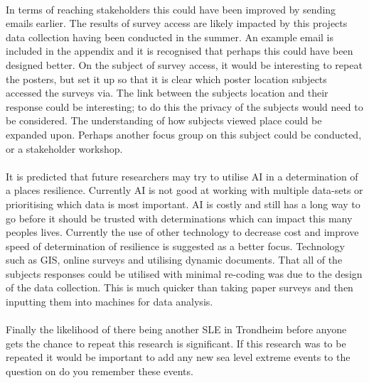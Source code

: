 \paragraph{}
In terms of reaching stakeholders this could have been improved by sending emails earlier. The results of survey access are likely impacted by this projects data collection having been conducted in the summer. An example email is included in the appendix and it is recognised that perhaps this could have been designed better. On the subject of survey access, it would be interesting to repeat the posters, but set it up so that it is clear which poster location subjects accessed the surveys via. The link between the subjects location and their response could be interesting; to do this the privacy of the subjects would need to be considered. The understanding of how subjects viewed place could be expanded upon. Perhaps another focus group on this subject could be conducted, or a stakeholder workshop. 
\paragraph{}
It is predicted that future researchers may try to utilise AI in a determination of a places resilience. Currently AI is not good at working with multiple data-sets or prioritising which data is most important. AI is costly and still has a long way to go before it should be trusted with determinations which can impact this many peoples lives. Currently the use of other technology to decrease cost and improve speed of determination of resilience is suggested as a better focus. Technology such as GIS, online surveys and utilising dynamic documents. That all of the subjects responses could be utilised with minimal re-coding was due to the design of the data collection. This is much quicker than taking paper surveys and then inputting them into machines for data analysis.
\paragraph{}
Finally the likelihood of there being another SLE in Trondheim before anyone gets the chance to repeat this research is significant. If this research was to be repeated it would be important to add any new sea level extreme events to the question on do you remember these events. 



